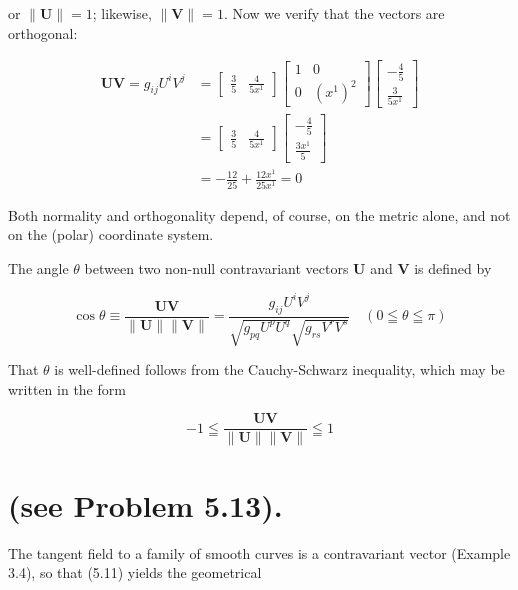 \documentclass[10pt]{article}
\begin{document}
or $\|\mathbf{U}\|=1$; likewise, $\|\mathbf{V}\|=1$. Now we verify that the vectors are orthogonal:

$$
\begin{aligned}
\mathbf{U V}=g_{i j} U^{i} V^{j} & =\left[\begin{array}{ll}
\frac{3}{5} & \frac{4}{5 x^{1}}
\end{array}\right]\left[\begin{array}{cc}
1 & 0 \\
0 & \left(x^{1}\right)^{2}
\end{array}\right]\left[\begin{array}{c}
-\frac{4}{5} \\
\frac{3}{5 x^{1}}
\end{array}\right] \\
& =\left[\begin{array}{ll}
\frac{3}{5} & \frac{4}{5 x^{1}}
\end{array}\right]\left[\begin{array}{r}
-\frac{4}{5} \\
\frac{3 x^{1}}{5}
\end{array}\right] \\
& =-\frac{12}{25}+\frac{12 x^{1}}{25 x^{1}}=0
\end{aligned}
$$

Both normality and orthogonality depend, of course, on the metric alone, and not on the (polar) coordinate system.

The angle $\theta$ between two non-null contravariant vectors $\mathbf{U}$ and $\mathbf{V}$ is defined by


\begin{equation*}
\cos \theta \equiv \frac{\mathbf{U V}}{\|\mathbf{U}\|\|\mathbf{V}\|}=\frac{g_{i j} U^{i} V^{j}}{\sqrt{g_{p q} U^{p} U^{q}} \sqrt{g_{r s} V^{r} V^{s}}} \quad(0 \leqq \theta \leqq \pi) \tag{5.11}
\end{equation*}


That $\theta$ is well-defined follows from the Cauchy-Schwarz inequality, which may be written in the form

$$
-1 \leqq \frac{\mathbf{U V}}{\|\mathbf{U}\|\|\mathbf{V}\|} \leqq 1
$$

\section*{(see Problem 5.13).}
The tangent field to a family of smooth curves is a contravariant vector (Example 3.4), so that (5.11) yields the geometrical
\end{document}
